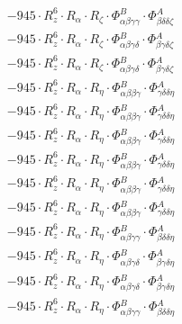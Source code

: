\documentclass{article}
\begin{document}
\begin{subequations}
\begin{gather}
\begin{array}{c}
 \\[0.2em] 		 - 945 \cdot R_{z}^{6} \cdot R_{\alpha{}} \cdot R_{\zeta{}} \cdot \Phi{}^{B}_{\alpha{}\beta{}\gamma{}\gamma{}} \cdot \Phi{}^{A}_{\beta{}\delta{}\delta{}\zeta{}} 
 \\[0.2em] 		 - 945 \cdot R_{z}^{6} \cdot R_{\alpha{}} \cdot R_{\zeta{}} \cdot \Phi{}^{B}_{\alpha{}\beta{}\gamma{}\delta{}} \cdot \Phi{}^{A}_{\beta{}\gamma{}\delta{}\zeta{}} 
 \\[0.2em] 		 - 945 \cdot R_{z}^{6} \cdot R_{\alpha{}} \cdot R_{\zeta{}} \cdot \Phi{}^{B}_{\alpha{}\beta{}\gamma{}\delta{}} \cdot \Phi{}^{A}_{\beta{}\gamma{}\delta{}\zeta{}} 
 \\[0.2em] 		 - 945 \cdot R_{z}^{6} \cdot R_{\alpha{}} \cdot R_{\eta{}} \cdot \Phi{}^{B}_{\alpha{}\beta{}\beta{}\gamma{}} \cdot \Phi{}^{A}_{\gamma{}\delta{}\delta{}\eta{}} 
 \\[0.2em] 		 - 945 \cdot R_{z}^{6} \cdot R_{\alpha{}} \cdot R_{\eta{}} \cdot \Phi{}^{B}_{\alpha{}\beta{}\beta{}\gamma{}} \cdot \Phi{}^{A}_{\gamma{}\delta{}\delta{}\eta{}} 
 \\[0.2em] 		 - 945 \cdot R_{z}^{6} \cdot R_{\alpha{}} \cdot R_{\eta{}} \cdot \Phi{}^{B}_{\alpha{}\beta{}\beta{}\gamma{}} \cdot \Phi{}^{A}_{\gamma{}\delta{}\delta{}\eta{}} 
 \\[0.2em] 		 - 945 \cdot R_{z}^{6} \cdot R_{\alpha{}} \cdot R_{\eta{}} \cdot \Phi{}^{B}_{\alpha{}\beta{}\beta{}\gamma{}} \cdot \Phi{}^{A}_{\gamma{}\delta{}\delta{}\eta{}} 
 \\[0.2em] 		 - 945 \cdot R_{z}^{6} \cdot R_{\alpha{}} \cdot R_{\eta{}} \cdot \Phi{}^{B}_{\alpha{}\beta{}\beta{}\gamma{}} \cdot \Phi{}^{A}_{\gamma{}\delta{}\delta{}\eta{}} 
 \\[0.2em] 		 - 945 \cdot R_{z}^{6} \cdot R_{\alpha{}} \cdot R_{\eta{}} \cdot \Phi{}^{B}_{\alpha{}\beta{}\beta{}\gamma{}} \cdot \Phi{}^{A}_{\gamma{}\delta{}\delta{}\eta{}} 
 \\[0.2em] 		 - 945 \cdot R_{z}^{6} \cdot R_{\alpha{}} \cdot R_{\eta{}} \cdot \Phi{}^{B}_{\alpha{}\beta{}\gamma{}\gamma{}} \cdot \Phi{}^{A}_{\beta{}\delta{}\delta{}\eta{}} 
 \\[0.2em] 		 - 945 \cdot R_{z}^{6} \cdot R_{\alpha{}} \cdot R_{\eta{}} \cdot \Phi{}^{B}_{\alpha{}\beta{}\gamma{}\delta{}} \cdot \Phi{}^{A}_{\beta{}\gamma{}\delta{}\eta{}} 
 \\[0.2em] 		 - 945 \cdot R_{z}^{6} \cdot R_{\alpha{}} \cdot R_{\eta{}} \cdot \Phi{}^{B}_{\alpha{}\beta{}\gamma{}\delta{}} \cdot \Phi{}^{A}_{\beta{}\gamma{}\delta{}\eta{}} 
 \\[0.2em] 		 - 945 \cdot R_{z}^{6} \cdot R_{\alpha{}} \cdot R_{\eta{}} \cdot \Phi{}^{B}_{\alpha{}\beta{}\gamma{}\gamma{}} \cdot \Phi{}^{A}_{\beta{}\delta{}\delta{}\eta{}} 

\end{array}
\end{gather}
\end{subequations}
\end{document}
